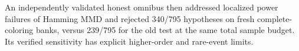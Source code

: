 An independently validated honest omnibus then addressed localized power failures of Hamming MMD and rejected 340/795 hypotheses on fresh complete-coloring banks, versus 239/795 for the old test at the same total sample budget. Its verified sensitivity has explicit higher-order and rare-event limits.
